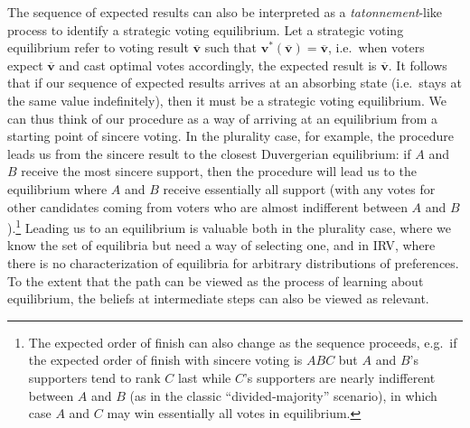 \documentclass[11pt,a4paper]{article}
\begin{document}
The sequence of expected results can also be interpreted as a \emph{tatonnement}-like process to identify a strategic voting equilibrium. Let a strategic voting equilibrium refer to voting result $\mathbf{\overline{v}}$ such that $\mathbf{v}^*(\overline{\mathbf{v}}) = \overline{\mathbf{v}}$, i.e.\ when voters expect $\mathbf{\overline{v}}$ and cast optimal votes accordingly, the expected result is $\mathbf{\overline{v}}$. It follows that if our sequence of expected results arrives at an absorbing state (i.e.\ stays at the same value indefinitely), then it must be a strategic voting equilibrium. We can thus think of our procedure as a way of arriving at an equilibrium from a starting point of sincere voting. In the plurality case, for example, the procedure leads us from the sincere result to the closest Duvergerian equilibrium: if $A$ and $B$ receive the most sincere support, then the procedure will lead us to the equilibrium where $A$ and $B$ receive essentially all support (with any votes for other candidates coming from voters who are almost indifferent between $A$ and $B$).\footnote{The expected order of finish can also change as the sequence proceeds, e.g.\ if the expected order of finish with sincere voting is $ABC$ but $A$ and $B$'s supporters tend to rank $C$ last while $C$'s supporters are nearly indifferent between $A$ and $B$ (as in the classic ``divided-majority'' scenario), in which case $A$ and $C$ may win essentially all votes in equilibrium.} Leading us to an equilibrium is valuable both in the plurality case, where we know the set of equilibria but need a way of selecting one, and in IRV, where there is no characterization of equilibria for arbitrary distributions of preferences. To the extent that the path can be viewed as the process of learning about equilibrium, the beliefs at  intermediate steps can also be viewed as relevant. \\  
\end{document}
